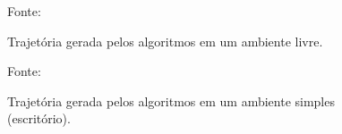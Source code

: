 \documentclass[xcolor=dvipsnames, aspectratio=169]{beamer}
\begin{document}
\begin{frame}
  \newpage
  \begin{figure}
    \centering
    {Fonte: \cite{buniyamin2011simple}}
    \caption{Trajetória gerada pelos algoritmos em um ambiente livre.}
    \label{fig:4_trajectory_path}
  \end{figure}
  \newpage
  \begin{figure}
    \centering
    {Fonte: \cite{buniyamin2011simple}}
    \caption{Trajetória gerada pelos algoritmos em um ambiente simples (escritório).}
    \label{fig:5_trajectory_path}
  \end{figure}
\end{frame}
\end{document}
